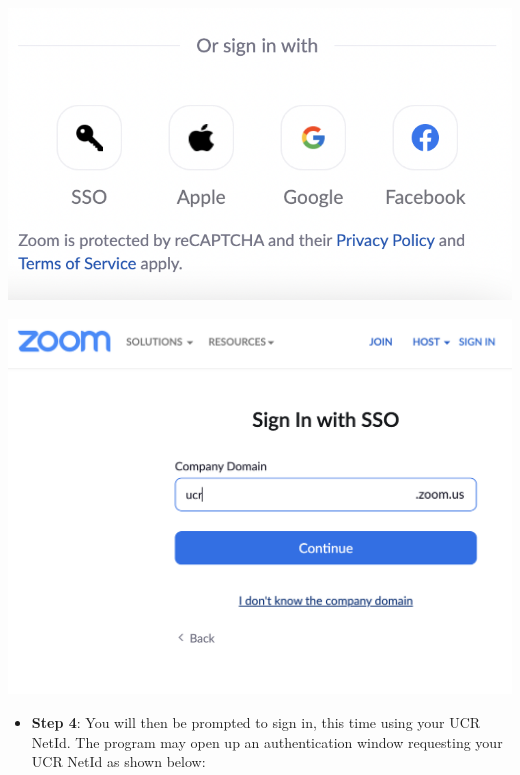 \documentclass[
]{book}
\providecommand{\tightlist}{%
  \setlength{\itemsep}{0pt}\setlength{\parskip}{0pt}}
\begin{document}
\begin{center}\includegraphics[width=10.25in]{images/zoomsso} \end{center}

\begin{center}\includegraphics[width=16.69in]{images/zoomdomain} \end{center}

\begin{itemize}
\tightlist
\item
  \textbf{Step 4}: You will then be prompted to sign in, this time using your UCR NetId. The program may open up an authentication window requesting your UCR NetId as shown below:
\end{itemize}
\end{document}
